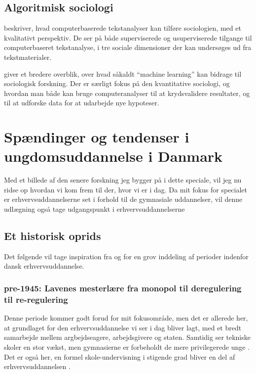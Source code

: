 {\section{Algoritmisk sociologi}\label{sec:review-compsoc}

\cite{evansMachineTranslationMining2016} beskriver, hvad computerbaserede tekstanalyser kan tilføre sociologien, med et kvalitativt perspektiv.
De ser på både superviserede og usuperviserede tilgange til computerbaseret tekstanalyse, i tre sociale dimensioner der kan undersøges ud fra tekstmaterialer.

 \cite{molinaMachineLearningSociology2019} giver et bredere overblik, over hvad såkaldt “machine learning” kan bidrage til sociologisk forskning.
Der er særligt fokus på den kvantitative sociologi, og hvordan man både kan bruge computeranalyser til at krydsvalidere resultater, og til at udforske data for at udarbejde nye hypoteser.

\chapter{Spændinger og tendenser i ungdomsuddannelse i Danmark}

Med et billede af den senere forskning jeg bygger på i dette speciale, vil jeg nu ridse op hvordan vi kom frem til der, hvor vi er i dag.
Da mit fokus for specialet er erhvervsuddannelserne set i forhold til de gymnasiale uddannelser, vil denne udlægning også tage udgangspunkt i erhvervsuddannelserne

\section{Et historisk oprids}

Det følgende vil tage inspiration fra \cite{bondergaardHistoricalEmergenceKey2014} og \cite{juulDiskurserOmUngdom2013} for en grov inddeling af perioder indenfor dansk erhvervsuddannelse.

\subsection*{pre-1945: Lavenes mesterlære fra monopol til deregulering til re-regulering}

Denne periode kommer  godt forud for mit fokusområde, men det er allerede her, at grundlaget for den erhvervsuddannelse vi ser i dag bliver lagt, med et bredt samarbejde mellem argbejdseagere, arbejdsgivere og staten.
Samtidig ser tekniske skoler en stor vækst, men gymnasierne er forbeholdt de mere privilegerede unge \autocite[s. 9]{bondergaardHistoricalEmergenceKey2014}.
Det er også her, en formel skole-undervisning i stigende grad bliver en del af erhvervsuddannelsen \autocite[s. 15ff]{bondergaardHistoricalEmergenceKey2014}. 

}
